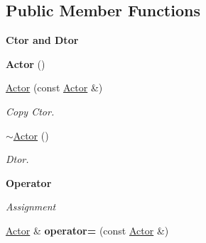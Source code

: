 \subsection*{Public Member Functions}
\begin{Indent}{\bf Ctor and Dtor}\par
{\em \label{_amgrpad04e46909a047f9938f8e1fa1abe24a}
 }\begin{DoxyCompactItemize}
\item 
\hypertarget{classContent_1_1Actor_1_1Admin_1_1Actor_aab91d7eb58cc0eb68a93348c43b66edc}{
{\bfseries Actor} ()}
\label{classContent_1_1Actor_1_1Admin_1_1Actor_aab91d7eb58cc0eb68a93348c43b66edc}

\item 
\hypertarget{classContent_1_1Actor_1_1Admin_1_1Actor_a14b256370162bdfe10303ce885113717}{
\hyperlink{classContent_1_1Actor_1_1Admin_1_1Actor_a14b256370162bdfe10303ce885113717}{Actor} (const \hyperlink{classContent_1_1Actor_1_1Admin_1_1Actor}{Actor} \&)}
\label{classContent_1_1Actor_1_1Admin_1_1Actor_a14b256370162bdfe10303ce885113717}

\begin{DoxyCompactList}\small\item\em Copy Ctor. \item\end{DoxyCompactList}\item 
\hypertarget{classContent_1_1Actor_1_1Admin_1_1Actor_ae74a8b002828164b7a2255dc237a7f6b}{
\hyperlink{classContent_1_1Actor_1_1Admin_1_1Actor_ae74a8b002828164b7a2255dc237a7f6b}{$\sim$Actor} ()}
\label{classContent_1_1Actor_1_1Admin_1_1Actor_ae74a8b002828164b7a2255dc237a7f6b}

\begin{DoxyCompactList}\small\item\em Dtor. \item\end{DoxyCompactList}\end{DoxyCompactItemize}
\end{Indent}
\begin{Indent}{\bf Operator}\par
{\em \label{_amgrpe1b3ec89ead7f83a9245ed5c9cacfdbf}
 Assignment }\begin{DoxyCompactItemize}
\item 
\hypertarget{classContent_1_1Actor_1_1Admin_1_1Actor_a618618b4fb87d9c6bb7a644e031877cb}{
\hyperlink{classContent_1_1Actor_1_1Admin_1_1Actor}{Actor} \& {\bfseries operator=} (const \hyperlink{classContent_1_1Actor_1_1Admin_1_1Actor}{Actor} \&)}
\label{classContent_1_1Actor_1_1Admin_1_1Actor_a618618b4fb87d9c6bb7a644e031877cb}

\end{DoxyCompactItemize}
\end{Indent}
